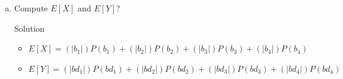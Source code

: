 \documentclass{article}
\begin{document}
\begin{spacing}{1.1}
\begin{homeworkProblem}
\begin{enumerate}[(a)]
      \begin{homeworkSection}{Solution}
        I believe $E[ X] < E[ Y]$.  My reason follows that since the 
        probability a student will be selected from a bus carrying more students 
        over a bus carrying less students.  
        Since the probability that a bus driver will be selected carry a bus with a large
        number of students is equal to a bus driver being selected from a bus carrying
        a small number of students.
      \end{homeworkSection}
    \item Compute $E[ X]$ and $E[ Y]$?
      \begin{homeworkSection}{Solution}
        \begin{itemize}
          \item $E[ X] = (|b_1|) P( b_1) + (|b_2|) P( b_2) + (|b_3|) P( b_3) + (|b_4|) P( b_4)$
          \item $E[ Y] = (|bd_1|) P( bd_1) + (|bd_2|) P( bd_2) + (|bd_3|) P( bd_3) + (|bd_4|) P( bd_4)$
        \end{itemize}
      \end{homeworkSection}
  \end{enumerate}
\end{homeworkProblem}


\end{spacing}
\end{document}
